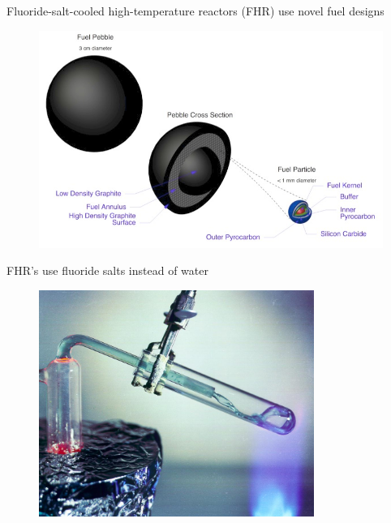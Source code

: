 \documentclass{beamer}
\begin{document}
    \begin{frame}{Fluoride-salt-cooled high-temperature reactors (FHR) use novel fuel designs}
        \begin{figure}
            \centering
            \includegraphics[width=1.0\textwidth]{./img/fhrPebble.png}
            \caption*{}
        \end{figure}
    \end{frame}

    \begin{frame}{FHR's use fluoride salts instead of water}
        \begin{figure}
            \centering
            \includegraphics[width=0.8\textwidth]{./img/fhrFlibe.png}
            \caption*{}
        \end{figure}
    \end{frame}
\end{document}
